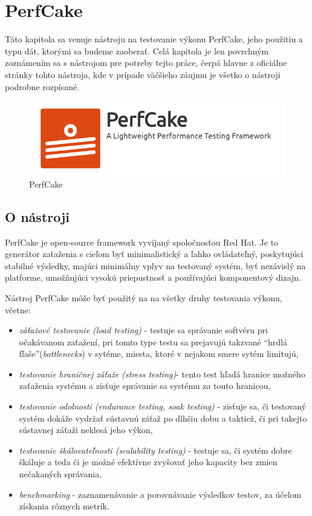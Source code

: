 \chapter{PerfCake}\label{perfcake}
\setcounter{page}{1}

Táto kapitola sa venuje nástroju na testovanie výkonu PerfCake, jeho použitiu a typu dát, ktorými sa budeme zaoberať. Celá kapitola je len povrchným zoznámením sa s nástrojom pre potreby tejto práce, čerpá hlavne z oficiálne stránky tohto nástroja, kde v prípade väčšieho záujmu je všetko o nástroji podrobne rozpísané.

\begin{figure}[ht]
\includegraphics[scale=1]{blog-logo.png}
\caption{PerfCake}
\end{figure} 

\section{O nástroji}

PerfCake je open-source framework vyvíjaný spoločnosťou Red Hat. Je to generátor zaťaženia s cieľom byť minimalistický a ľahko ovládateľný, poskytujúci stabilné výsledky, majúci minimálny vplyv na testovaný systém, byť nezávislý na platforme, umožňujúci vysokú priepustnosť a používajúci komponentový dizajn.

Nástroj PerfCake môže byť použitý na na všetky druhy testovania výkonu, včetne: 
\begin{itemize}  
\item \textit{záťažové testovanie (load testing)} - testuje sa správanie softvéru pri očakávanom zaťažení, pri tomto type testu sa prejavujú takzvané ``hrdlá fľaše''(\textit{bottlenecks}) v sytéme, miesta, ktoré v nejakom smere sytém limitujú,
\item \textit{testovanie hraničnej záťaže (stress testing)}- tento test hľadá hranice možného zaťaženia systému a zisťuje správanie sa systému za touto hranicou,
\item \textit{testovanie odolnosti (endurance testing, soak testing)} - zisťuje sa, či testovaný systém dokáže vydržať sústavnú záťaž po dlhšiu dobu a taktiež, či pri takejto sústavnej záťaži neklesá jeho výkon,
\item \textit{testovanie škálovateľnosti (scalability testing)} - testuje sa, či systém dobre škáluje a teda či je možné efektívne zvyšovať jeho kapacity bez zmien nečakaných správania,
\item \textit{benchmarking} - zaznamenávanie a porovnávanie výsledkov testov, za účelom získania rôznych metrík.
\end{itemize}

